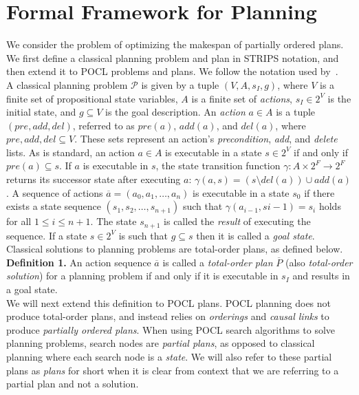 \section{Formal Framework for Planning}

We consider the problem of optimizing the makespan of partially ordered plans. We first define a classical planning problem and plan in STRIPS notation, and then extend it to POCL problems and plans. We follow the notation used by~\cite{Bercher2020POPvsPOCL}.\\


A classical planning problem $\mathcal{P}$ is given by a tuple $(V,A,s_I,g)$, where $V$ is a finite set of propositional state variables, $A$ is a finite set of \textit{actions}, $s_I\in 2^V$ is the initial state, and $g\subseteq V$ is the goal description. An \textit{action} $a\in A$ is a tuple $(pre, add, del)$, referred to as $pre(a)$, $add(a)$, and $del(a)$, where $pre, add, del \subseteq V$. These sets represent an action's \textit{precondition}, \textit{add}, and \textit{delete} lists. As is standard, an action $a\in A$ is executable in a state $s\in 2^V$ if and only if $pre(a)\subseteq s$. If $a$ is executable in $s$, the state transition function $\gamma : A \times 2^F \rightarrow 2^F$ returns its successor state after executing $a$: $\gamma (a,s)=(s\setminus del(a))\cup add(a)$. A sequence of actions $\overline{a}=(a_0,a_1,\ldots,a_n)$ is executable in a state $s_0$ if there exists a state sequence $(s_1,s_2,\ldots ,s_{n+1})$ such that $\gamma (a_{i-1},s{i-1})=s_i$ holds for all $1\leq i \leq n+1$. The state $s_{n+1}$ is called the \textit{result} of executing the sequence. If a state $s\in 2^V$ is such that $g\subseteq s$ then it is called a \textit{goal state}.\\


Classical solutions to planning problems are total-order plans, as defined below.\\

\textbf{Definition 1.} An action sequence $\overline{a}$ is called a \textit{total-order plan} $\overline{P}$ (also \textit{total-order solution}) for a planning problem if and only if it is executable in $s_I$ and results in a goal state.\\


We will next extend this definition to POCL plans. POCL planning does not produce total-order plans, and instead relies on \textit{orderings} and \textit{causal links} to produce \textit{partially ordered plans}. When using POCL search algorithms to solve planning problems, search nodes are \textit{partial plans}, as opposed to classical planning where each search node is a \textit{state}. We will also refer to these partial plans as \textit{plans} for short when it is clear from context that we are referring to a partial plan and not a solution.\\


